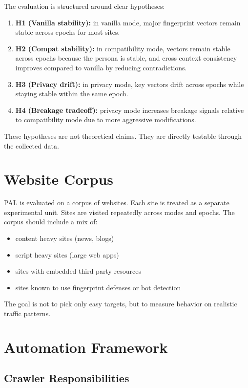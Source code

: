 \documentclass[11pt]{report}
\begin{document}
The evaluation is structured around clear hypotheses:

\begin{enumerate}
    \item \textbf{H1 (Vanilla stability):} in vanilla mode, major fingerprint vectors remain stable across epochs for most sites.
    \item \textbf{H2 (Compat stability):} in compatibility mode, vectors remain stable across epochs because the persona is stable, and cross context consistency improves compared to vanilla by reducing contradictions.
    \item \textbf{H3 (Privacy drift):} in privacy mode, key vectors drift across epochs while staying stable within the same epoch.
    \item \textbf{H4 (Breakage tradeoff):} privacy mode increases breakage signals relative to compatibility mode due to more aggressive modifications.
\end{enumerate}

These hypotheses are not theoretical claims. They are directly testable through the collected data.

\section{Website Corpus}

PAL is evaluated on a corpus of websites. Each site is treated as a separate experimental unit. Sites are visited repeatedly across modes and epochs. The corpus should include a mix of:

\begin{itemize}
    \item content heavy sites (news, blogs)
    \item script heavy sites (large web apps)
    \item sites with embedded third party resources
    \item sites known to use fingerprint defenses or bot detection
\end{itemize}

The goal is not to pick only easy targets, but to measure behavior on realistic traffic patterns.

\section{Automation Framework}

\subsection{Crawler Responsibilities}
\end{document}
